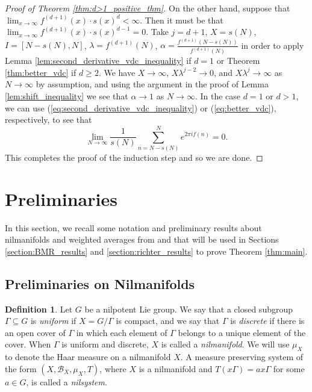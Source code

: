\documentclass[12pt]{article}
\theoremstyle{plain} %
\theoremstyle{definition} %
\newtheorem{definition}[theorem]{Definition}
\theoremstyle{plain}
\theoremstyle{plain}
\numberwithin{equation}{section}
\renewcommand{\geq}{\geqslant}
\renewcommand{\subset}{\subseteq}
\newcommand{\1}{\mathbbm{1}}
\newcommand{\oo}{\infty}
\begin{document}
\begin{proof}[Proof of Theorem \ref{thm:d>1_positive_thm}]
    On the other hand, suppose that  $\lim_{x\to\oo}f^{(d+1)}(x)\cdot s(x)^{d}<\oo$. Then it must be that $\lim_{x\to\oo}f^{(d+1)}(x)\cdot {s}(x)^{d-1}=0$. Take $j=d+1$, $X=s(N)$, $I = [N-s(N),N]$, $\lambda = f^{(d+1)}(N)$, $\alpha = \frac{f^{(d+1)}(N-s(N))}{f^{(d+1)}(N)}$ in order to apply Lemma \ref{lem:second_derivative_vdc_inequality} if $d=1$ or Theorem \ref{thm:better_vdc} if $d\geq 2$. We have $X\to \oo$, $X\lambda^{j-2}\to 0$, and $X\lambda^j \to \oo$ as $N\to\oo$ by assumption, and using the argument in the proof of Lemma \ref{lem:shift_inequality} we see that $\alpha\to 1$ as $N\to\oo$. In the case $d=1$ or $d>1$, we can use (\ref{eq:second_derivative_vdc_inequality}) or (\ref{eq:better_vdc}), respectively, to see that $$
    \lim_{N\to\oo}\frac{1}{s(N)}\sum_{n=N-s(N)}^Ne^{2\pi i f(n)}=0.
    $$
    This completes the proof of the induction step and so we are done.
\end{proof}

\section{Preliminaries}\label{section:preliminaries} 
In this section, we recall some notation and preliminary results about nilmanifolds and weighted averages from \cite{BMR24} and \cite{Richter23} that will be used in Sections \ref{section:BMR_results} and \ref{section:richter_results} to prove Theorem \ref{thm:main}. 

\subsection{Preliminaries on Nilmanifolds}

\begin{definition}\label{def:nilsystem}
  Let $G$ be a nilpotent Lie group. 
  We say that a closed subgroup $\Gamma\subset G$ is \emph{uniform} if $X = G/\Gamma$ is compact, and we say that $\Gamma$ is \emph{discrete} if there is an open cover of $\Gamma$ in which each element of $\Gamma$ belongs to a unique element of the cover. When $\Gamma$ is uniform and discrete, $X$ is called a \emph{nilmanifold}. We will use $\mu_X$ to denote the Haar measure on a nilmanifold $X$. A measure preserving system of the form $(X,\mathscr{B}_X,\mu_X,T)$, where $X$ is a nilmanifold and $T(x\Gamma) = ax\Gamma$ for some $a\in G$, is called a \emph{nilsystem}.
\end{definition}
\end{document}
